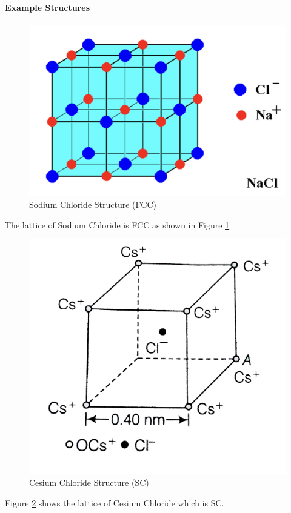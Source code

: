 \documentclass[../main.tex]{subfiles}
\begin{document}
\paragraph{Example Structures}
\begin{figure}[ht]
    \centering
    \includegraphics[scale=0.3]{nacl.png}
    \caption{Sodium Chloride Structure (FCC)}
    \label{fig:1.1}
\end{figure}

The lattice of Sodium Chloride is FCC as shown in Figure \ref{fig:1.1}

\begin{figure}[ht]
    \centering
    \includegraphics[width=0.3\linewidth]{cecl.png}
    \caption{Cesium Chloride Structure (SC)}
    \label{fig:1.2}
\end{figure}

Figure \ref{fig:1.2} shows the lattice of Cesium Chloride which is SC.
\end{document}
